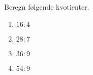 \documentclass[../main.tex]{subfiles}
\begin{document}
\begin{prob}
    Beregn følgende kvotienter.
    \begin{enumerate}[label=\alph*)]
        \item \(\displaystyle 16 : 4\)
        \vspace{3mm}
        \item \(\displaystyle 28 : 7\)
        \vspace{3mm}
        \item \(\displaystyle 36 : 9\)
        \vspace{3mm}
        \item \(\displaystyle 54 : 9\)
    \end{enumerate}
\end{prob}
\end{document}
